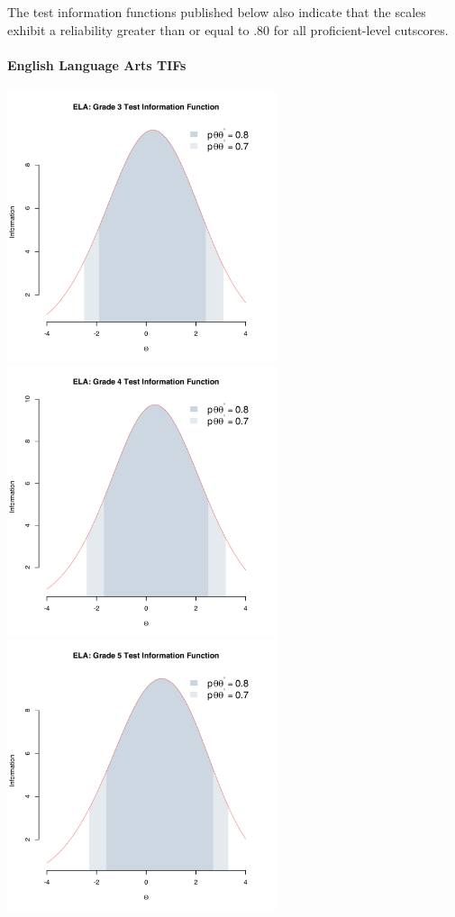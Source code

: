 \documentclass[]{article}
\let\oldparagraph\paragraph
\renewcommand{\paragraph}[1]{\oldparagraph{#1}\mbox{}}
\begin{document}
The test information functions published below also indicate that the
scales exhibit a reliability greater than or equal to .80 for all
proficient-level cutscores.

\hypertarget{english-language-arts-tifs}{%
\paragraph{English Language Arts
TIFs}\label{english-language-arts-tifs}}

\FloatBarrier

\includegraphics[width=\textwidth,height=3.125in]{tifs/ela3tif.pdf}
\includegraphics[width=\textwidth,height=3.125in]{tifs/ela4tif.pdf}
\includegraphics[width=\textwidth,height=3.125in]{tifs/ela5tif.pdf}
\end{document}
